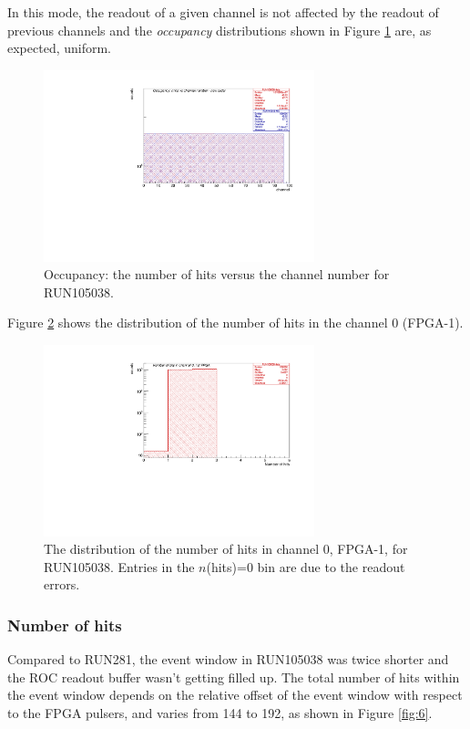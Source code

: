 In this mode, the readout of a given channel is not affected by the readout of previous
channels and the \textit{occupancy} distributions shown in Figure \ref{fig:5} are, as expected, uniform.
\begin{figure}[!h]
\centering
\includegraphics[width =0.7\textwidth]{figures/pdf/figure_00002_nhitsvschannel_roc_simulation_2.pdf}
\caption{Occupancy: the number of hits versus the channel number for RUN105038.}
\label{fig:5}
\end{figure}


Figure \ref{fig:67} shows the distribution of the number of hits in the channel 0 (FPGA-1).
\begin{figure}[!h]
\centering
\includegraphics[width =0.7\textwidth]{figures/pdf/figure_00067_nhits_ch00_run105038.pdf}
\caption{
  The distribution of the number of hits in channel 0, FPGA-1, for RUN105038.
  Entries in the $n$(hits)=0 bin are due to the readout errors.
}
\label{fig:67}
\end{figure}

\subsubsection{Number of hits}
Compared to RUN281, the event window in RUN105038 was twice shorter
and the ROC readout buffer wasn't getting filled up.
The total number of hits within the event window depends on the relative offset
of the event window with respect to the FPGA pulsers, and varies from
144 to 192, as shown in Figure \ref{fig:6}.

